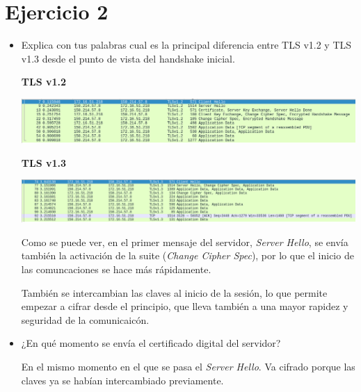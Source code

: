 \documentclass{article}
\begin{document}
\newpage

\section{Ejercicio 2}

\begin{itemize}
\item Explica con tus palabras cual es la principal diferencia entre TLS v1.2 y TLS v1.3 desde el punto de vista del handshake inicial.

\textbf{TLS v1.2}

\begin{flushleft}
\includegraphics[scale=0.4]{meneame.png}
\end{flushleft}

\textbf{TLS v1.3}

\begin{flushleft}
\includegraphics[scale=0.35]{tls13.png}
\end{flushleft}

Como se puede ver, en el primer mensaje del servidor, \textit{Server Hello}, se envía también la activación de la suite (\textit{Change Cipher Spec}), por lo que el inicio de las comuncaciones se hace más rápidamente.

También se intercambian las claves al inicio de la sesión, lo que permite empezar a cifrar desde el principio, que lleva también a una mayor rapidez y seguridad de la comunicaicón.
\item ¿En qué momento se envía el certificado digital del servidor?

En el mismo momento en el que se pasa el \textit{Server Hello}. Va cifrado porque las claves ya se habían intercambiado previamente.
\end{itemize}
\end{document}

